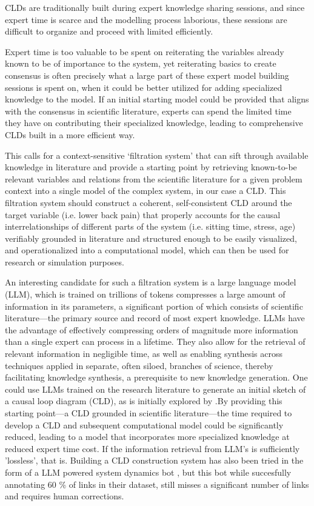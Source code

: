   CLDs are traditionally built during expert knowledge sharing sessions, and since expert time is scarce and the modelling process laborious, these sessions are difficult to organize and proceed with limited efficiently. \cite{deutsch2024}

Expert time is too valuable to be spent on reiterating the variables already known to be of importance to the system, yet reiterating basics to create consensus is often precisely what a large part of these expert model building sessions is spent on, when it could be better utilized for adding specialized knowledge to the model. If an initial starting model could be provided that aligns with the consensus in scientific literature, experts can spend the limited time they have on contributing their specialized knowledge, leading to comprehensive CLDs built in a more efficient way. 

This calls for a context-sensitive ‘filtration system’ that can sift through available knowledge in literature and provide a starting point by retrieving known-to-be relevant variables and relations from the scientific literature for a given problem context into a single model of the complex system, in our case a CLD. This filtration system should construct a coherent, self-consistent CLD around the target variable (i.e. lower back pain) that properly accounts for the causal interrelationships of different parts of the system (i.e. sitting time, stress, age) verifiably grounded in literature and structured enough to be easily visualized, and operationalized into a computational model, which can then be used for research or simulation purposes.


An interesting candidate for such a filtration system is a large language model (LLM), which is trained on trillions of tokens compresses a large amount of information in its parameters, a significant portion of which consists of scientific literature—the primary source and record of most expert knowledge. LLMs have the advantage of effectively compressing orders of magnitude more information than a single expert can process in a lifetime. They also allow for the retrieval of relevant information in negligible time, as well as enabling synthesis across techniques applied in separate, often siloed, branches of science, thereby facilitating knowledge synthesis, a prerequisite to new knowledge generation.
One could use LLMs trained on the research literature to generate an initial sketch of a causal loop diagram (CLD), as is initially explored by \cite{liu2024leveraging} \cite{Waaijers2024theoraizer}.By providing this starting point—a CLD grounded in scientific literature—the time required to develop a CLD and subsequent computational model could be significantly reduced, leading to a model that incorporates more specialized knowledge at reduced expert time cost. If the information retrieval from LLM's is sufficiently 'lossless', that is.  
Building a CLD construction system has also been tried in the form of a LLM powered system dynamics bot \cite{hosseinichimeh2024textmapdynamicsbot}, but this bot while succesfully annotating 60 \% of links in their dataset, still misses a significant number of links and requires human corrections. 

